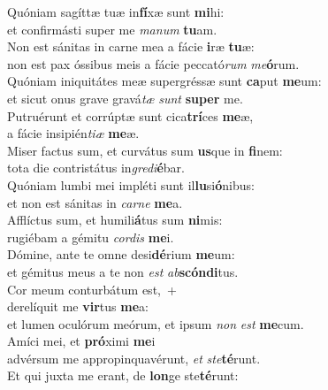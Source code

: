\evenverse Quóniam sagíttæ tuæ in\textbf{fí}xæ sunt \textbf{mi}hi:~\*\\
\evenverse et confirmásti super me \textit{ma}\textit{num} \textbf{tu}am.\\
\oddverse Non est sánitas in carne mea a fácie \textbf{i}ræ \textbf{tu}æ:~\*\\
\oddverse non est pax óssibus meis a fácie peccató\textit{rum} \textit{me}\textbf{ó}rum.\\
\evenverse Quóniam iniquitátes meæ supergréssæ sunt \textbf{ca}put \textbf{me}um:~\*\\
\evenverse et sicut onus grave gravá\textit{tæ} \textit{sunt} \textbf{su}\textbf{per} me.\\
\oddverse Putruérunt et corrúptæ sunt cica\textbf{trí}ces \textbf{me}æ,~\*\\
\oddverse a fácie insipién\textit{ti}\textit{æ} \textbf{me}æ.\\
\evenverse Miser factus sum, et curvátus sum \textbf{us}que in \textbf{fi}nem:~\*\\
\evenverse tota die contristátus in\textit{gre}\textit{di}\textbf{é}bar.\\
\oddverse Quóniam lumbi mei impléti sunt il\textbf{lu}si\textbf{ó}nibus:~\*\\
\oddverse et non est sánitas in \textit{car}\textit{ne} \textbf{me}a.\\
\evenverse Afflíctus sum, et humili\textbf{á}tus sum \textbf{ni}mis:~\*\\
\evenverse rugiébam a gémitu \textit{cor}\textit{dis} \textbf{me}i.\\
\oddverse Dómine, ante te omne desi\textbf{dé}rium \textbf{me}um:~\*\\
\oddverse et gémitus meus a te non \textit{est} \textit{ab}\textbf{scón}\textbf{di}tus.\\
\evenverse Cor meum conturbátum est,~+\\
\evenverse  derelíquit me \textbf{vir}tus \textbf{me}a:~\*\\
\evenverse et lumen oculórum meórum, et ipsum \textit{non} \textit{est} \textbf{me}cum.\\
\oddverse Amíci mei, et \textbf{pró}ximi \textbf{me}i~\*\\
\oddverse advérsum me appropinquavérunt, \textit{et} \textit{ste}\textbf{té}runt.\\
\evenverse Et qui juxta me erant, de \textbf{lon}ge ste\textbf{té}runt:~\*\\
